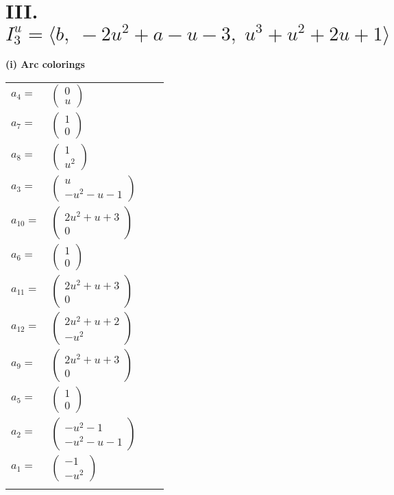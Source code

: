 \documentclass[1p]{elsarticle_modified}
\theoremstyle{definition}
\begin{document}
\centering \section*{III. $I^u_{3}= \langle b,\;-2 u^2+a- u-3,\;u^3+u^2+2 u+1 \rangle$}
\flushleft \textbf{(i) Arc colorings}\\
\begin{tabular}{m{7pt} m{180pt} m{7pt} m{180pt} }
\flushright $a_{4}=$&$\begin{pmatrix}0\\u\end{pmatrix}$ \\
\flushright $a_{7}=$&$\begin{pmatrix}1\\0\end{pmatrix}$ \\
\flushright $a_{8}=$&$\begin{pmatrix}1\\u^2\end{pmatrix}$ \\
\flushright $a_{3}=$&$\begin{pmatrix}u\\- u^2- u-1\end{pmatrix}$ \\
\flushright $a_{10}=$&$\begin{pmatrix}2 u^2+u+3\\0\end{pmatrix}$ \\
\flushright $a_{6}=$&$\begin{pmatrix}1\\0\end{pmatrix}$ \\
\flushright $a_{11}=$&$\begin{pmatrix}2 u^2+u+3\\0\end{pmatrix}$ \\
\flushright $a_{12}=$&$\begin{pmatrix}2 u^2+u+2\\- u^2\end{pmatrix}$ \\
\flushright $a_{9}=$&$\begin{pmatrix}2 u^2+u+3\\0\end{pmatrix}$ \\
\flushright $a_{5}=$&$\begin{pmatrix}1\\0\end{pmatrix}$ \\
\flushright $a_{2}=$&$\begin{pmatrix}- u^2-1\\- u^2- u-1\end{pmatrix}$ \\
\flushright $a_{1}=$&$\begin{pmatrix}-1\\- u^2\end{pmatrix}$\\&\end{tabular}
\end{document}
